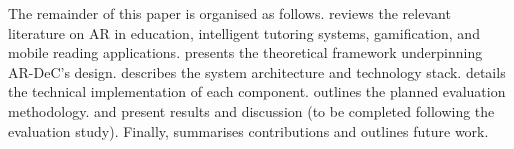The remainder of this paper is organised as follows.  reviews the relevant literature on AR in education, intelligent tutoring systems, gamification, and mobile reading applications.  presents the theoretical framework underpinning AR-DeC's design.  describes the system architecture and technology stack.  details the technical implementation of each component.  outlines the planned evaluation methodology.  and  present results and discussion (to be completed following the evaluation study). Finally,  summarises contributions and outlines future work.
